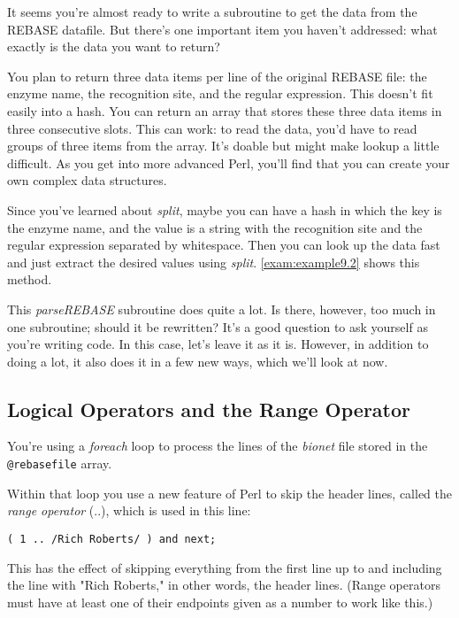 It seems you're almost ready to write a subroutine to get the data from the REBASE datafile. But there's one important item you haven't addressed: what exactly is the data you want to return?

You plan to return three data items per line of the original REBASE file: the enzyme name, the recognition site, and the regular expression. This doesn't fit easily into a hash. You can return an array that stores these three data items in three consecutive slots. This can work: to read the data, you'd have to read groups of three items from the array. It's doable but might make lookup a little difficult. As you get into more advanced Perl, you'll find that you can create your own complex data structures.

Since you've learned about \textit{split}, maybe you can have a hash in which the key is the enzyme name, and the value is a string with the recognition site and the regular expression separated by whitespace. Then you can look up the data fast and just extract the desired values using \textit{split}. \autoref{exam:example9.2} shows this method. 



This \textit{parseREBASE} subroutine does quite a lot. Is there, however, too much in one subroutine; should it be rewritten? It's a good question to ask yourself as you're writing code. In this case, let's leave it as it is. However, in addition to doing a lot, it also does it in a few new ways, which we'll look at now. 

\subsection{Logical Operators and the Range Operator}
You're using a \textit{foreach} loop to process the lines of the \textit{bionet} file stored in the \verb|@rebasefile| array.

Within that loop you use a new feature of Perl to skip the header lines, called the \textit{range operator} (..), which is used in this line:

\begin{lstlisting}
( 1 .. /Rich Roberts/ ) and next;
\end{lstlisting}

This has the effect of skipping everything from the first line up to and including the line with "Rich Roberts," in other words, the header lines. (Range operators must have at least one of their endpoints given as a number to work like this.)

